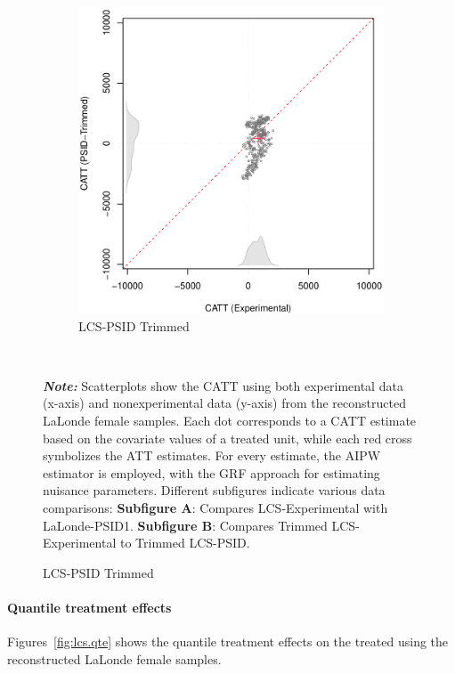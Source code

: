 \documentclass[letterpaper,12pt,leqno]{article}
\begin{document}
\begin{figure}[!ht]
\begin{minipage}[c]{1\textwidth}
\begin{subfigure}{0.4\linewidth}
            \includegraphics[width=\linewidth]{catt_lcs_psid_trim.pdf}
            \caption{LCS-PSID Trimmed}
        \end{subfigure}
    \end{minipage}%
    \\\raggedright
     {\footnotesize\textbf{\textit{Note:}} Scatterplots show the CATT using both experimental data (x-axis) and nonexperimental data (y-axis) from the reconstructed LaLonde female samples. Each dot corresponds to a CATT estimate based on the covariate values of a treated unit, while each red cross symbolizes the ATT estimates. For every estimate, the AIPW estimator is employed, with the GRF approach for estimating nuisance parameters. Different subfigures indicate various data comparisons: \textbf{Subfigure A}: Compares LCS-Experimental with LaLonde-PSID1. \textbf{Subfigure B}: Compares Trimmed LCS-Experimental to Trimmed LCS-PSID.}
\end{figure}
\clearpage

\paragraph{Quantile treatment effects} Figures~\ref{fig:lcs.qte} shows the quantile treatment effects on the treated using the reconstructed LaLonde female samples.
\end{document}
